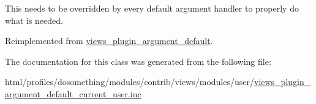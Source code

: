 This needs to be overridden by every default argument handler to properly do what is needed. 

Reimplemented from \hyperlink{classviews__plugin__argument__default_a8e67864f4a1ce20b12bc82afe1acd255}{views\_\-plugin\_\-argument\_\-default}.

The documentation for this class was generated from the following file:\begin{DoxyCompactItemize}
\item 
html/profiles/dosomething/modules/contrib/views/modules/user/\hyperlink{views__plugin__argument__default__current__user_8inc}{views\_\-plugin\_\-argument\_\-default\_\-current\_\-user.inc}\end{DoxyCompactItemize}
